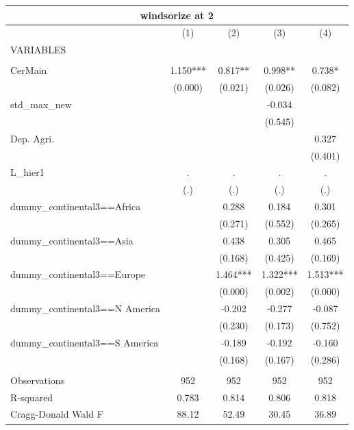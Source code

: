 \begin{tabular}{lcccc}
\multicolumn{5}{c}{windsorize at 2} \\ \hline
 & (1) & (2) & (3) & (4) \\
VARIABLES &  &  &  &  \\ \hline
 &  &  &  &  \\
CerMain & 1.150*** & 0.817** & 0.998** & 0.738* \\
 & (0.000) & (0.021) & (0.026) & (0.082) \\
std\_max\_new &  &  & -0.034 &  \\
 &  &  & (0.545) &  \\
Dep. Agri. &  &  &  & 0.327 \\
 &  &  &  & (0.401) \\
L\_hier1 & . & . & . & . \\
 & (.) & (.) & (.) & (.) \\
dummy\_continental3==Africa &  & 0.288 & 0.184 & 0.301 \\
 &  & (0.271) & (0.552) & (0.265) \\
dummy\_continental3==Asia &  & 0.438 & 0.305 & 0.465 \\
 &  & (0.168) & (0.425) & (0.169) \\
dummy\_continental3==Europe &  & 1.464*** & 1.322*** & 1.513*** \\
 &  & (0.000) & (0.002) & (0.000) \\
dummy\_continental3==N America &  & -0.202 & -0.277 & -0.087 \\
 &  & (0.230) & (0.173) & (0.752) \\
dummy\_continental3==S America &  & -0.189 & -0.192 & -0.160 \\
 &  & (0.168) & (0.167) & (0.286) \\
 &  &  &  &  \\
Observations & 952 & 952 & 952 & 952 \\
R-squared & 0.783 & 0.814 & 0.806 & 0.818 \\
 Cragg-Donald Wald F & 88.12 & 52.49 & 30.45 & 36.89 \\ \hline
\end{tabular}
